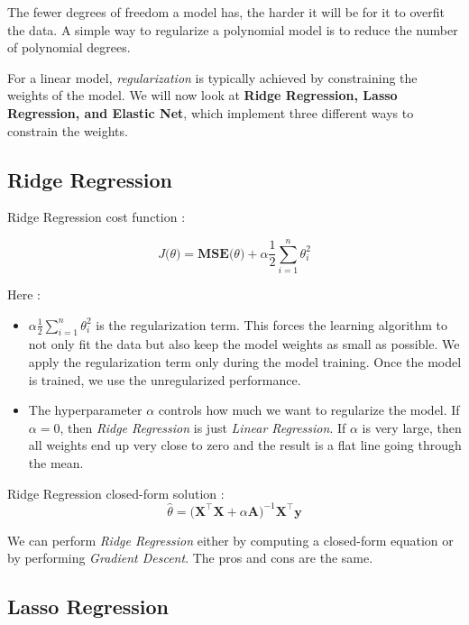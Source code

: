 \documentclass[11pt, a4paper]{book}
\begin{document}
The fewer degrees of freedom a model has, the harder it will be for it
to overfit the data. A simple way to regularize a polynomial model is to
reduce the number of polynomial degrees.

For a linear model, \emph{regularization} is typically achieved by
constraining the weights of the model. We will now look at \textbf{Ridge
Regression, Lasso Regression, and Elastic Net}, which implement three
different ways to constrain the weights.

    \hypertarget{ridge-regression}{%
\subsection{Ridge Regression}\label{ridge-regression}}

Ridge Regression cost function :

\[J \big( \theta \big) = \mathbf{MSE}\big( \theta \big) + \alpha\frac{1}{2}\sum_{i=1}^{n} \theta_{i}^{2}\]

Here :

\begin{itemize}
\item
  \(\alpha\frac{1}{2}\sum_{i=1}^{n} \theta_{i}^{2}\) is the
  regularization term. This forces the learning algorithm to not only
  fit the data but also keep the model weights as small as possible. We
  apply the regularization term only during the model training. Once the
  model is trained, we use the unregularized performance.
\item
  The hyperparameter \(\alpha\) controls how much we want to regularize the
  model. If \(\alpha = 0\), then \emph{Ridge Regression} is just
  \emph{Linear Regression}. If \(\alpha\) is very large, then all
  weights end up very close to zero and the result is a flat line going
  through the mean.
\end{itemize}

Ridge Regression closed-form solution :
\[\hat\theta = \big( \mathbf{X^{\intercal} X} + \alpha\mathbf{A} \big)^{-1}\mathbf{X^{\intercal}y}\]

We can perform \emph{Ridge Regression} either by computing a closed-form
equation or by performing \emph{Gradient Descent}. The pros and cons are
the same.

    \hypertarget{lasso-regression}{%
\subsection{Lasso Regression}\label{lasso-regression}}
\end{document}
